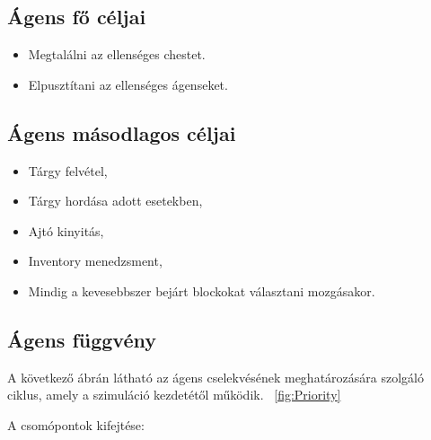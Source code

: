 \subsection{Ágens fő céljai}

\begin{itemize}
    \item Megtalálni az ellenséges chestet.
    \item Elpusztítani az ellenséges ágenseket.
\end{itemize}

\subsection{Ágens másodlagos céljai}

\begin{itemize}
    \item Tárgy felvétel,
    \item Tárgy hordása adott esetekben,
    \item Ajtó kinyitás,
    \item Inventory menedzsment,
    \item Mindig a kevesebbszer bejárt blockokat választani mozgásakor.
\end{itemize}

\subsection{Ágens függvény}

A következő ábrán látható az ágens cselekvésének meghatározására szolgáló ciklus, amely a szimuláció kezdetétől működik. ~\ref{fig:Priority}

\noindent A csomópontok kifejtése:


